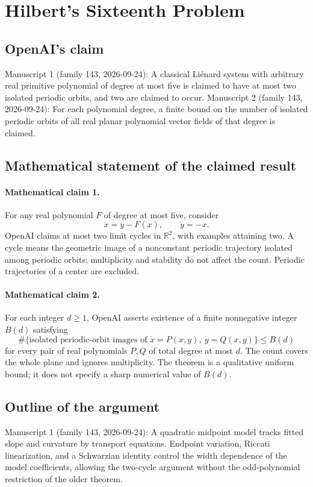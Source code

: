\documentclass[11pt]{article}
\begin{document}
\section*{Hilbert's Sixteenth Problem}

\subsection{OpenAI's claim}
Manuscript 1 (family 143, 2026-09-24): A classical Liénard system with arbitrary real primitive polynomial of degree at most five is claimed to have at most two isolated periodic orbits, and two are claimed to occur. Manuscript 2 (family 143, 2026-09-24): For each polynomial degree, a finite bound on the number of isolated periodic orbits of all real planar polynomial vector fields of that degree is claimed.

\subsection{Mathematical statement of the claimed result}
\paragraph{Mathematical claim 1.} For any real polynomial $F$ of degree at most five, consider
\[
\dot x=y-F(x),\qquad\dot y=-x.
\]
OpenAI claims at most two limit cycles in $\mathbb R^2$, with examples attaining two. A cycle means the geometric image of a nonconstant periodic trajectory isolated among periodic orbits; multiplicity and stability do not affect the count. Periodic trajectories of a center are excluded.

\paragraph{Mathematical claim 2.} For each integer $d\ge1$, OpenAI asserts existence of a finite nonnegative integer $B(d)$ satisfying
\[
\#\{\text{isolated periodic-orbit images of }\dot x=P(x,y),\ \dot y=Q(x,y)\}\le B(d)
\]
for every pair of real polynomials $P,Q$ of total degree at most $d$. The count covers the whole plane and ignores multiplicity. The theorem is a qualitative uniform bound; it does not specify a sharp numerical value of $B(d)$.

\subsection{Outline of the argument}
Manuscript 1 (family 143, 2026-09-24): A quadratic midpoint model tracks fitted slope and curvature by transport equations. Endpoint variation, Riccati linearization, and a Schwarzian identity control the width dependence of the model coefficients, allowing the two-cycle argument without the odd-polynomial restriction of the older theorem.
\end{document}
